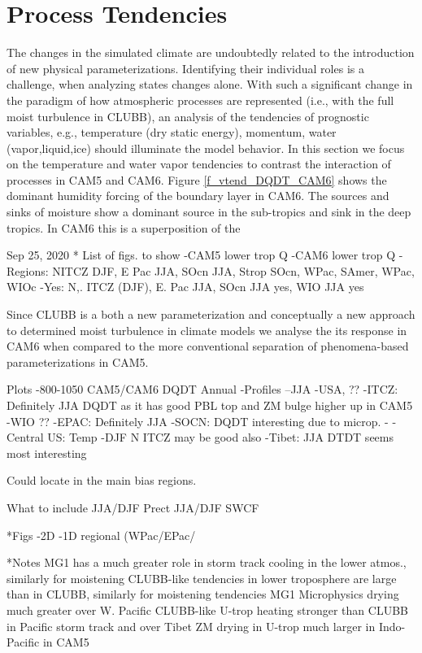 \section{Process Tendencies}
\label{sec:tendencies}

The changes in the simulated climate are undoubtedly related to the introduction of new physical parameterizations. Identifying their individual roles is a challenge, when analyzing states changes alone. With such a significant change in the paradigm of how atmospheric processes are represented (i.e., with the full moist turbulence in CLUBB), an analysis of the tendencies of prognostic variables, e.g., temperature (dry static energy), momentum, water (vapor,liquid,ice) should illuminate the model behavior. In this section we focus on the temperature and water vapor tendencies to contrast the interaction of processes in CAM5 and CAM6. Figure \ref{f_vtend_DQDT_CAM6} shows the dominant humidity forcing of the boundary layer in CAM6. The sources and sinks of moisture show a dominant source in the sub-tropics and sink in the deep tropics. In CAM6 this is a superposition of the




Sep 25, 2020
* List of figs. to show
-CAM5 lower trop Q
-CAM6 lower trop Q
-Regions: NITCZ DJF, E Pac JJA, SOcn JJA, Strop SOcn, WPac, SAmer, WPac, WIOc
-Yes: N,. ITCZ (DJF), E. Pac JJA, SOcn JJA yes, WIO JJA yes


Since CLUBB is a both a new parameterization and conceptually a new approach to determined moist turbulence in climate models we analyse the its response in CAM6 when compared to the more conventional separation of phenomena-based parameterizations in CAM5. 

Plots
-800-1050 CAM5/CAM6 DQDT Annual
-Profiles
--JJA
-USA, ??
-ITCZ: Definitely JJA  DQDT as it has good PBL top and ZM bulge higher up in CAM5
-WIO ??
-EPAC: Definitely JJA 
-SOCN: DQDT interesting due to microp.
-
-Central US: Temp
-DJF N ITCZ may be good also
-Tibet: JJA DTDT seems most interesting


Could locate in the main bias regions.


What to include
JJA/DJF Prect
JJA/DJF SWCF


*Figs
-2D
-1D regional (WPac/EPac/

*Notes
MG1 has a much greater role in storm track cooling in the lower atmos., similarly for moistening
CLUBB-like tendencies in lower troposphere are large than in CLUBB, similarly for moistening tendencies
MG1 Microphysics drying much greater over W. Pacific
CLUBB-like U-trop heating stronger than CLUBB in Pacific storm track and over Tibet
ZM drying in U-trop much larger in Indo-Pacific in CAM5

